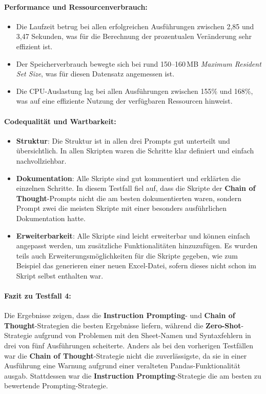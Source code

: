 \documentclass[11pt,a4paper]{article}
\begin{document}
\paragraph{Performance und Ressourcenverbrauch:}
\begin{itemize}
    \item Die Laufzeit betrug bei allen erfolgreichen Ausführungen zwischen 2,85 und 3,47 Sekunden, was für die Berechnung der prozentualen Veränderung sehr effizient ist.
    \item Der Speicherverbrauch bewegte sich bei rund 150--160\,MB \emph{Maximum Resident Set Size}, was für diesen Datensatz angemessen ist.
    \item Die CPU-Auslastung lag bei allen Ausführungen zwischen 155\% und 168\%, was auf eine effiziente Nutzung der verfügbaren Ressourcen hinweist.
\end{itemize}

\paragraph{Codequalität und Wartbarkeit:}
\begin{itemize}
    \item \textbf{Struktur}: Die Struktur ist in allen drei Prompts gut unterteilt und übersichtlich. In allen Skripten waren die Schritte klar definiert und einfach nachvollziehbar.
    \item \textbf{Dokumentation}: Alle Skripte sind gut kommentiert und erklärten die einzelnen Schritte. In diesem Testfall fiel auf, dass die Skripte der \textbf{Chain of Thought}-Prompts nicht die am besten dokumentierten waren, sondern Prompt zwei die meisten Skripte mit einer besonders ausführlichen Dokumentation hatte.
    \item \textbf{Erweiterbarkeit}: Alle Skripte sind leicht erweiterbar und können einfach angepasst werden, um zusätzliche Funktionalitäten hinzuzufügen. Es wurden teils auch Erweiterungsmöglichkeiten für die Skripte gegeben, wie zum Beispiel das generieren einer neuen Excel-Datei, sofern dieses nicht schon im Skript selbst enthalten war. 
\end{itemize}

\paragraph{Fazit zu Testfall 4:}
Die Ergebnisse zeigen, dass die \textbf{Instruction Prompting}- und \textbf{Chain of Thought}-Strategien die besten Ergebnisse liefern, während die \textbf{Zero-Shot}-Strategie aufgrund von Problemen mit den Sheet-Namen und Syntaxfehlern in drei von fünf Ausführungen scheiterte. Anders als bei den vorherigen Testfällen war die \textbf{Chain of Thought}-Strategie nicht die zuverlässigste, da sie in einer Ausführung eine Warnung aufgrund einer veralteten Pandas-Funktionalität ausgab. Stattdessen war die \textbf{Instruction Prompting}-Strategie die am besten zu bewertende Prompting-Strategie.
\end{document}
